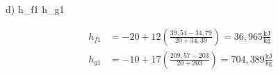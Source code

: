 d)  h_{f1}  h_{g1}

\begin{align*}
h_{f1} & = -20 + 12 \left( \frac{39,54 - 34,79}{20 + 34,39} \right) = 36,965 \frac{\text{kJ}}{\text{kg}} \\
h_{g1} & = -10 + 17 \left( \frac{209,57 - 203}{20 + 203} \right) = 704,389 \frac{\text{kJ}}{\text{kg}}
\end{align*}